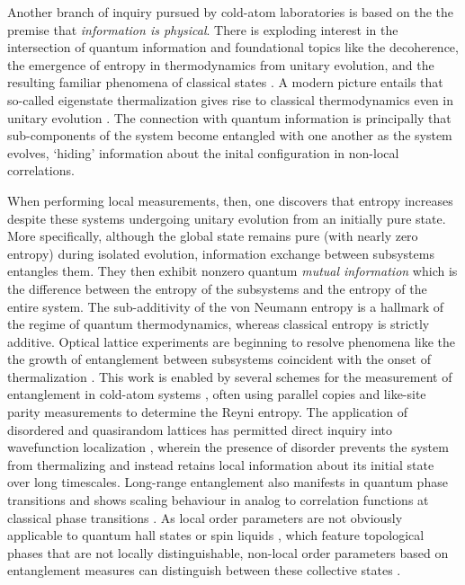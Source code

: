 	Another branch of inquiry pursued by cold-atom laboratories is based on the the premise that \emph{information is physical}.
	There is exploding interest in the intersection of quantum information and foundational topics like the decoherence, the emergence of entropy in thermodynamics from unitary evolution, and the resulting familiar phenomena of classical states \cite{Osborne02,Osterloh02,Isakov11,Jiang12,Dalessio16,Goold16,Srednicki94,Amico08,Eisert15}.
	A modern picture entails that so-called eigenstate thermalization gives rise to classical thermodynamics even in unitary evolution \cite{Srednicki94,Dalessio16,Goold16}.
	The connection with quantum information is principally that sub-components of the system become entangled with one another as the system evolves, `hiding' information about the inital configuration in non-local correlations.
	
	When performing local measurements, then, one discovers that entropy increases despite these systems undergoing unitary evolution from an initially pure state.
	More specifically, although the global state remains pure (with nearly zero entropy) during isolated evolution, information exchange between subsystems entangles them.
	They then exhibit nonzero quantum \emph{mutual information} which is the difference between the entropy of the subsystems and the entropy of the entire system.
	The sub-additivity of the von Neumann entropy is a hallmark of the regime of quantum thermodynamics, whereas classical entropy is strictly additive.
	Optical lattice experiments are beginning to resolve phenomena like the the growth of entanglement between subsystems coincident with the onset of thermalization \cite{Clos16,Kaufman16}.
	This work is enabled by several schemes for the measurement of entanglement in cold-atom systems \cite{Chiu18,Brydges19,Daley12,Mouraalves04}, often using parallel copies and like-site parity measurements to determine the Reyni entropy.
	The application of disordered and quasirandom lattices has permitted direct inquiry into wavefunction localization \cite{Anderson58,Dalessio16,Goold16,Srednicki94,Clos16,Kaufman16,Nandkishore15}, wherein the presence of disorder prevents the system from thermalizing and instead retains local information about its initial state over long timescales.
	Long-range entanglement also manifests in quantum phase transitions \cite{Osborne02} and shows scaling behaviour in analog to correlation functions at classical phase transitions \cite{Osterloh02}.
	As local order parameters are not obviously applicable to quantum hall states or spin liquids \cite{Isakov11}, which feature topological phases that are not locally distinguishable, non-local order parameters based on entanglement measures can distinguish between these collective states \cite{Isakov11,Jiang12}.

